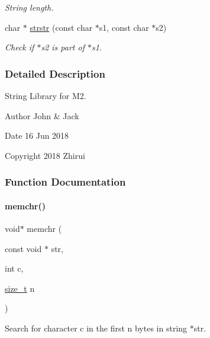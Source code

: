 \begin{DoxyCompactItemize}
\begin{DoxyCompactList}\small\item\em String length. \end{DoxyCompactList}\item 
char $\ast$ \mbox{\hyperlink{a00128_aeb923ee2a7a01f82eb1e2f8ae188c6d4}{strstr}} (const char $\ast$s1, const char $\ast$s2)
\begin{DoxyCompactList}\small\item\em Check if $\ast$s2 is part of $\ast$s1. \end{DoxyCompactList}\end{DoxyCompactItemize}


\subsubsection{Detailed Description}
String Library for M2. 

\begin{DoxyAuthor}{Author}
John \& Jack 
\end{DoxyAuthor}
\begin{DoxyDate}{Date}
16 Jun 2018 
\end{DoxyDate}
\begin{DoxyCopyright}{Copyright}
2018 Zhirui 
\end{DoxyCopyright}


\subsubsection{Function Documentation}
\mbox{\label{a00128_af2c756015b1cb92274fc019a175ae8bb}} 
\paragraph{\texorpdfstring{memchr()}{memchr()}}
{\footnotesize\ttfamily void$\ast$ memchr (\begin{DoxyParamCaption}\item[{const void $\ast$}]{str,  }\item[{int}]{c,  }\item[{\mbox{\hyperlink{a00131_a43b4547e12226fef871eed8afe191ad7}{size\+\_\+t}}}]{n }\end{DoxyParamCaption})}



Search for character c in the first n bytes in string $\ast$str. 


